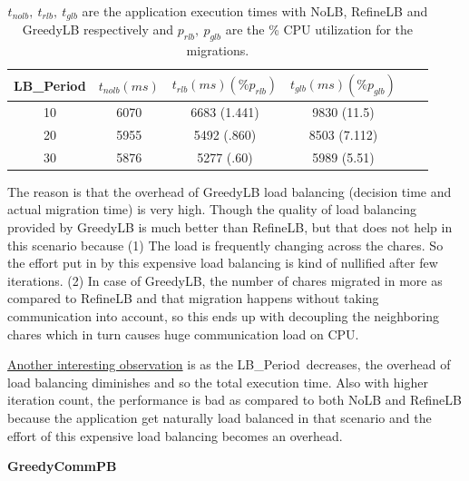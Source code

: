 \documentclass[10pt,times]{report}
\newcommand{\lbp}{LB\_Period}
\begin{document}
  \begin{table}[h]
  \begin{tabular}{|c|c|c|c|c|c|}
  \hline
  \multicolumn{1}{|l|}{LB\_Period} & \multicolumn{1}{l|}{$t_{nolb} (ms)$} &
  \multicolumn{1}{l|}{$t_{rlb} (ms) ( \% p_{rlb})$} &
  \multicolumn{1}{l|}{$t_{glb} (ms) (\%p_{glb})$} \\ \hline 10
  &  6070                     & 6683   (1.441)                   & 9830  (11.5)
  \\ \hline 20                           &  5955                     & 5492
  (.860)                    & 8503  (7.112)                           \\ \hline
  30                           &  5876                     & 5277   (.60)
  & 5989  (5.51)                        \\ \hline \end{tabular} \caption
{$t_{nolb},\ t_{rlb},\ t_{glb}$ are the application execution times with NoLB, RefineLB and
  GreedyLB respectively and $p_{rlb},\ p_{glb}$ are the \% CPU utilization for
    the migrations.} \end{table}
 
The reason is that the overhead of GreedyLB load balancing  (decision time and
    actual migration time) is very high. Though the quality of load balancing
provided by GreedyLB is much better than RefineLB, but that does not help in
this scenario because (1) The load is frequently changing across the chares. So
the effort put in by this expensive load balancing is kind of nullified after
few iterations.  (2) In case of GreedyLB, the number of chares migrated in more
as compared to RefineLB and that migration happens without taking communication
into account, so this ends up with decoupling the neighboring chares which in
turn causes huge communication load on CPU.

\underline{Another interesting observation} is as the \lbp\ decreases, the overhead of load
balancing diminishes and so the total execution time.      Also with higher
iteration count, the performance is bad as compared to both NoLB and RefineLB
because the application get naturally load balanced in that scenario and the
effort of this expensive load balancing becomes an overhead.

\pagebreak

\begin{flushleft}
\textbf{\Large{GreedyCommPB}}
\end{flushleft}
\end{document}
